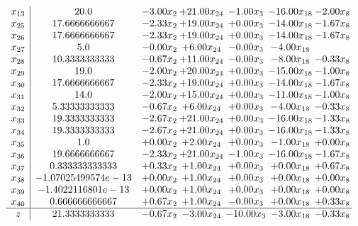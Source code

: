 \documentclass[8pt]{article}
\begin{document}
\[\begin{array}{c| c c@{\hskip 2pt} c@{\hskip 2pt} c@{\hskip 2pt} c@{\hskip 2pt} c@{\hskip 2pt} }
 x_{13}   &  20.0 & -3.00 x_{2} & + 21.00 x_{24} & -1.00 x_{3} & -16.00 x_{18} & -2.00 x_{8}\\
 x_{25}   &  17.6666666667 & -2.33 x_{2} & + 19.00 x_{24} & +  0.00 x_{3} & -14.00 x_{18} & -1.67 x_{8}\\
 x_{26}   &  17.6666666667 & -2.33 x_{2} & + 19.00 x_{24} & +  0.00 x_{3} & -14.00 x_{18} & -1.67 x_{8}\\
 x_{27}   &  5.0 & -0.00 x_{2} & +  6.00 x_{24} & -0.00 x_{3} & -4.00 x_{18} &   \\
 x_{28}   &  10.3333333333 & -0.67 x_{2} & + 11.00 x_{24} & -0.00 x_{3} & -8.00 x_{18} & -0.33 x_{8}\\
 x_{29}   &  19.0 & -2.00 x_{2} & + 20.00 x_{24} & +  0.00 x_{3} & -15.00 x_{18} & -1.00 x_{8}\\
 x_{30}   &  17.6666666667 & -2.33 x_{2} & + 19.00 x_{24} & +  0.00 x_{3} & -14.00 x_{18} & -1.67 x_{8}\\
 x_{31}   &  14.0 & -2.00 x_{2} & + 15.00 x_{24} & +  0.00 x_{3} & -11.00 x_{18} & -1.00 x_{8}\\
 x_{32}   &  5.33333333333 & -0.67 x_{2} & +  6.00 x_{24} & +  0.00 x_{3} & -4.00 x_{18} & -0.33 x_{8}\\
 x_{33}   &  19.3333333333 & -2.67 x_{2} & + 21.00 x_{24} & +  0.00 x_{3} & -16.00 x_{18} & -1.33 x_{8}\\
 x_{34}   &  19.3333333333 & -2.67 x_{2} & + 21.00 x_{24} & +  0.00 x_{3} & -16.00 x_{18} & -1.33 x_{8}\\
 x_{35}   &  1.0 & +  0.00 x_{2} & +  2.00 x_{24} & +  0.00 x_{3} & -1.00 x_{18} & +  0.00 x_{8}\\
 x_{36}   &  19.6666666667 & -2.33 x_{2} & + 21.00 x_{24} & -1.00 x_{3} & -16.00 x_{18} & -1.67 x_{8}\\
 x_{37}   &  0.333333333333 & +  0.33 x_{2} & +  1.00 x_{24} & +  0.00 x_{3} & +  0.00 x_{18} & +  0.67 x_{8}\\
 x_{38}   &  -1.07025499574e-13 & +  0.00 x_{2} & +  1.00 x_{24} & +  0.00 x_{3} & +  0.00 x_{18} & +  0.00 x_{8}\\
 x_{39}   &  -1.4022116801e-13 & +  0.00 x_{2} & +  1.00 x_{24} & +  0.00 x_{3} & +  0.00 x_{18} & +  0.00 x_{8}\\
 x_{40}   &  0.666666666667 & +  0.67 x_{2} & +  1.00 x_{24} & -0.00 x_{3} & +  0.00 x_{18} & +  0.33 x_{8}\\
\hline
z    &  21.3333333333 & -0.67 x_{2} & -3.00 x_{24} & -10.00 x_{3} & -3.00 x_{18} & -0.33 x_{8}\\
\end{array}\]
\end{document}
